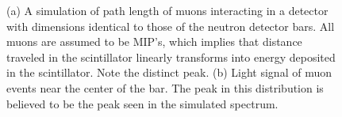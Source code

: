 \begin{figure}[!htbp]
\centering
{}
\caption[Characteristic peak in energy spectrum due to muons.]{(a) A simulation of path length of muons interacting in a detector with dimensions identical to those of the neutron detector bars.  All muons are assumed to be MIP's, which implies that distance traveled in the scintillator linearly transforms into energy deposited in the scintillator.  Note the distinct peak. (b) Light signal of muon events near the center of the bar.  The peak in this distribution is believed to be the peak seen in the simulated spectrum.}
\label{fig:muonSpectrum}
\end{figure}
